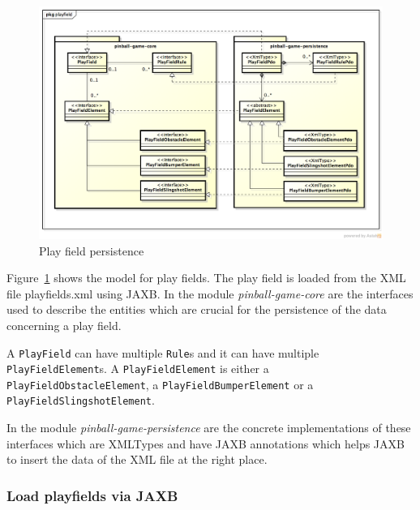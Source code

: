 \documentclass[fontsize=12pt,
               paper=a4,
               twoside=false,
               parskip=half,
               ]{scrartcl}
\begin{document}
\begin{figure}[h!]
	\centering
	\includegraphics[width=15.5cm]{./img/persistence-playfield.png}
	\caption[Play field persistence]{Play field persistence}
	\label{fig:playfield_persistence}
\end{figure}

Figure~\ref{fig:playfield_persistence} shows the model for play fields. The play field is loaded from the XML file playfields.xml using JAXB. In the module \emph{pinball-game-core} are the interfaces used to describe the entities which are crucial for the persistence of the data concerning a play field.

A \texttt{PlayField} can have multiple \texttt{Rule}s and it can have multiple \texttt{PlayFieldElement}s. A \texttt{PlayFieldElement} is either a \texttt{PlayFieldObstacleElement}, a \texttt{PlayFieldBumperElement} or a \texttt{PlayFieldSlingshotElement}.

In the module \emph{pinball-game-persistence} are the concrete implementations of these interfaces which are XMLTypes and have JAXB annotations which helps JAXB to insert the data of the XML file at the right place.

\subsubsection{Load playfields via JAXB}
\end{document}
